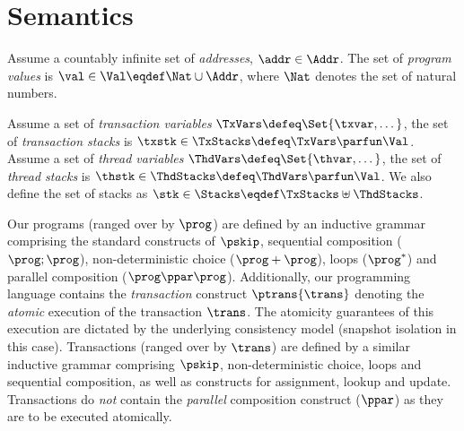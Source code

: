 \section{Semantics\label{sec:semantics}}
\begin{defn}
\label{def:prgram_values}
Assume a countably infinite set of \emph{addresses}, $\addr \in \Addr$. The set of \emph{program values} is $\val \in \Val \eqdef \Nat \cup \Addr$, where $\Nat$ denotes the set of natural numbers.
\end{defn}
%
\begin{defn}[Stacks]
\label{def:stacks}
Assume a set of \emph{transaction variables} \( \TxVars \defeq \Set{\txvar, \dots}\), the set of \emph{transaction stacks} is \( \txstk \in \TxStacks \defeq \TxVars \parfun \Val \).
Assume a set of \emph{thread variables} \( \ThdVars \defeq \Set{\thvar, \dots}\), the set of \emph{thread stacks} is \( \thstk \in \ThdStacks \defeq \ThdVars \parfun \Val \).
We also define the set of stacks as \( \stk \in \Stacks \eqdef \TxStacks \uplus \ThdStacks \).
\end{defn}
%
Our programs (ranged over by $\prog$) are defined by an inductive grammar comprising the standard constructs of $\pskip$, sequential composition ($\prog; \prog$), non-deterministic choice ($\prog+\prog$), loops ($\prog^*$) and parallel composition ($\prog \ppar \prog$). Additionally, our programming language contains the \emph{transaction} construct $\ptrans{\trans}$ denoting the \emph{atomic} execution of the transaction $\trans$. The atomicity guarantees of this execution are dictated by the underlying consistency model (snapshot isolation in this case).
Transactions (ranged over by $\trans$) are defined by a similar inductive grammar comprising $\pskip$, non-deterministic choice, loops and sequential composition, as well as constructs for assignment, lookup and update. Transactions do \emph{not} contain the \emph{parallel} composition construct ($\ppar$) as they are to be executed atomically.

